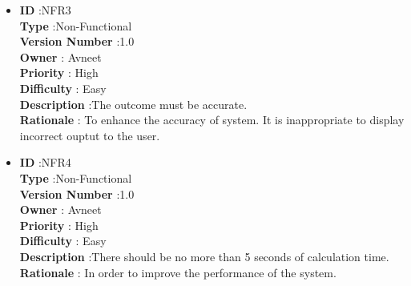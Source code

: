 \documentclass[a4paper,12pt]{report}
\begin{document}
\begin{itemize}
	\item
    \textbf{ID } \hspace{3cm} :NFR3  \\
	\textbf{Type } \hspace{2.4cm}  :Non-Functional\\
	\textbf{Version Number} \hspace{0.3cm} :1.0  \\
	\textbf{Owner } \hspace{1.98cm} : Avneet \\
	\textbf{Priority } \hspace{1.75cm} : High\\
	\textbf{Difficulty } \hspace{1.5cm} : Easy\\
	\textbf{Description }\hspace{1.2cm} :The outcome must be accurate.\\
	\textbf{Rationale }\hspace{1.6cm} :  To enhance the accuracy of system. It is inappropriate to display incorrect ouptut to the user.\\

	\item
    \textbf{ID } \hspace{3cm} :NFR4  \\
	\textbf{Type } \hspace{2.4cm}  :Non-Functional\\
	\textbf{Version Number} \hspace{0.3cm} :1.0  \\
	\textbf{Owner } \hspace{1.98cm} : Avneet \\
	\textbf{Priority } \hspace{1.75cm} : High\\
	\textbf{Difficulty } \hspace{1.5cm} : Easy\\
	\textbf{Description }\hspace{1.2cm} :There should be no more than 5 seconds of calculation time.\\
	\textbf{Rationale }\hspace{1.6cm} :  In order to improve the performance of the system.\\


\end{itemize}
\end{document}
